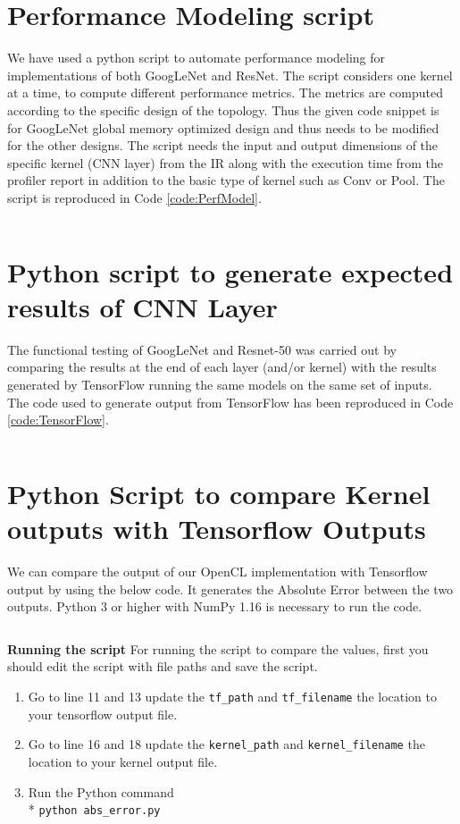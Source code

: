 \section{Performance Modeling script}
We have used a python script to automate performance modeling for implementations of both GoogLeNet and ResNet. The script considers one kernel at a time, to compute different performance metrics. The metrics are computed according to the specific design of the topology. Thus the given code snippet is for GoogLeNet global memory optimized design and thus needs to be modified for the other designs. The script needs the input and output dimensions of the specific kernel (CNN layer) from the IR along with the execution time from the profiler report in addition to the basic type of kernel such as Conv or Pool. The script is reproduced in Code \ref{code:PerfModel}.

\inputminted[breaklines=true]{Python}{img/PerfModel.py}




\section{Python script to generate expected results of CNN Layer}
The functional testing of GoogLeNet and Resnet-50 was carried out by comparing the results at the end of each layer (and/or kernel) with the results generated by TensorFlow running the same models on the same set of inputs. The code used to generate output from TensorFlow has been reproduced in Code \ref{code:TensorFlow}.

\inputminted[breaklines=true]{Python}{img/TensorFlow.py}

\section{Python Script to compare Kernel outputs with Tensorflow Outputs}
We can compare the output of our OpenCL implementation with Tensorflow output by using the below code. It generates the Absolute Error between the two outputs.  Python 3 or higher with NumPy 1.16 is necessary to run the code. 

\inputminted[breaklines=true]{Python}{img/abs_error.py}

\textbf{Running the script}
For running the script to compare the values, first you should edit the script with file paths and save the script.
\begin{enumerate}
\item Go to line 11 and 13 update the \texttt{tf\_path} and \texttt{tf\_filename} the location to your tensorflow output file.
\item Go to line 16 and 18 update the \texttt{kernel\_path} and \texttt{kernel\_filename} the location to your kernel output file.
\item Run the Python command \\*
          \texttt{python abs\_error.py}
\end{enumerate}

